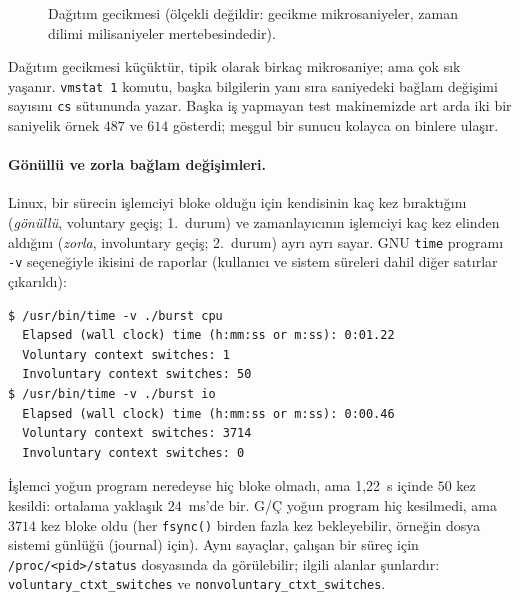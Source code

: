 \documentclass[11pt,a4paper]{article}
\newcommand{\cmd}[1]{\texttt{#1}}
\begin{document}
\begin{figure}[H]
\centering
{}
\caption{Dağıtım gecikmesi (ölçekli değildir: gecikme mikrosaniyeler, zaman dilimi milisaniyeler mertebesindedir).}
\end{figure}

Dağıtım gecikmesi küçüktür, tipik olarak birkaç mikrosaniye; ama çok sık yaşanır. \cmd{vmstat 1} komutu, başka bilgilerin yanı sıra saniyedeki bağlam değişimi sayısını \texttt{cs} sütununda yazar. Başka iş yapmayan test makinemizde art arda iki bir saniyelik örnek $487$ ve $614$ gösterdi; meşgul bir sunucu kolayca on binlere ulaşır.

\paragraph{Gönüllü ve zorla bağlam değişimleri.} Linux, bir sürecin işlemciyi bloke olduğu için kendisinin kaç kez bıraktığını (\emph{gönüllü}, voluntary geçiş; 1.~durum) ve zamanlayıcının işlemciyi kaç kez elinden aldığını (\emph{zorla}, involuntary geçiş; 2.~durum) ayrı ayrı sayar. GNU \cmd{time} programı \cmd{-v} seçeneğiyle ikisini de raporlar (kullanıcı ve sistem süreleri dahil diğer satırlar çıkarıldı):

\begin{lstlisting}[style=term]
$ /usr/bin/time -v ./burst cpu
  Elapsed (wall clock) time (h:mm:ss or m:ss): 0:01.22
  Voluntary context switches: 1
  Involuntary context switches: 50
$ /usr/bin/time -v ./burst io
  Elapsed (wall clock) time (h:mm:ss or m:ss): 0:00.46
  Voluntary context switches: 3714
  Involuntary context switches: 0
\end{lstlisting}

{\sloppy İşlemci yoğun program neredeyse hiç bloke olmadı, ama 1,22~s içinde $50$ kez kesildi: ortalama yaklaşık $24$~ms'de bir. G/Ç yoğun program hiç kesilmedi, ama $3714$ kez bloke oldu (her \cmd{fsync()} birden fazla kez bekleyebilir, örneğin dosya sistemi günlüğü (journal) için). Aynı sayaçlar, çalışan bir süreç için \cmd{/proc/<pid>/status} dosyasında da görülebilir; ilgili alanlar şunlardır:
\texttt{voluntary\_ctxt\_switches} ve \texttt{nonvoluntary\_ctxt\_switches}.\par}
\end{document}
